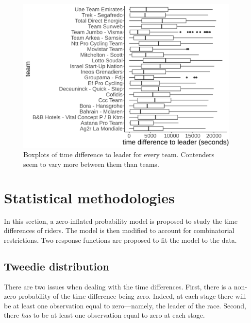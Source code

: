 \documentclass[aos,preprint]{imsart}
\begin{document}
\begin{figure}[h]
  \centering
  \includegraphics[scale=0.5]{fig/timediff_team.png}
  \caption{Boxplots of time difference to leader for every team. Contenders seem to vary more between them than teams.}
  \label{fig:timediff_team}
\end{figure}






\section{Statistical methodologies} \label{sec:stats}

In this section, a zero-inflated probability model is proposed to study the time differences of riders. The model is then modified to account for combinatorial restrictions. Two response functions are proposed to fit the model to the data.


\subsection{Tweedie distribution}

There are two issues when dealing with the time differences. First, there is a non-zero probability of the time difference being zero. Indeed, at each stage there will be at least one observation equal to zero---namely, the leader of the race. Second, there \textit{has} to be at least one observation equal to zero at each stage. \\
\end{document}
